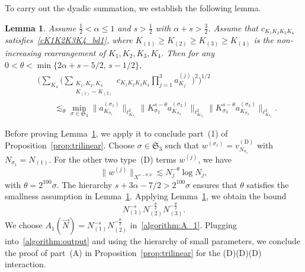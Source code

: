 \documentclass[11pt,reqno,english]{amsart}
\numberwithin{equation}{section}
\theoremstyle{plain}
\newtheorem{lemma}[theorem]{Lemma}
\theoremstyle{definition}
\theoremstyle{remark}
\begin{document}
To carry out the dyadic summation, we establish the following lemma.

\begin{lemma}\label{lem:dyadicsum1}
	Assume $\frac{1}{2}<\alpha\leq 1$ and $s>\frac{1}{2}$ with $\alpha+s>\frac{3}{2}$. Assume that $c_{K_1 K_2 K_3 K_4}$ satisfies~\eqref{cK1K2K3K4_bd1},
	where $K_{(1)}\geq K_{(2)}\geq K_{(3)}\geq K_{(4)}$ is the non-increasing rearrangement of $K_1,K_2,K_3,K_4$. Then for any $0<\theta<\min\{2\alpha+s-5/2,\, s-1/2\}$,
	\begin{align*}
		&\Big(\sum_{K_4}\Big(\sum_{\substack{K_1,K_2,K_3\\ K_{(1)}\sim K_{(2)}}} c_{K_1 K_2 K_3 K_4}\prod_{j=1}^3 a_{K_j}^{(j)}\Big)^2\Big)^{1/2}\\
		&\qquad\lesssim_{\theta} \min_{\sigma\in \mathfrak{S}_3}\|a_{K_{\sigma_1}}^{(\sigma_1)}\|_{\ell_{K_{\sigma_1}}^2}
		\|K_{\sigma_2}^{s-\theta}a_{K_{\sigma_2}}^{(\sigma_2)}\|_{\ell_{K_{\sigma_2}}^2}
		\|K_{\sigma_3}^{s-\theta}a_{K_{\sigma_3}}^{(\sigma_3)}\|_{\ell_{K_{\sigma_3}}^2}.
	\end{align*}
\end{lemma}

Before proving Lemma~\ref{lem:dyadicsum1}, we apply it to conclude part~(1) of Proposition~\ref{prop:trilinear}. Choose $\sigma\in\mathfrak{S}_3$ such that $w^{(\sigma_1)}=v^{(\mathrm{D})}_{N_{\sigma_1}}$ with $N_{\sigma_1}=N_{(1)}$. For the other two type~(D) terms $w^{(j)}$, we have
\[
\|w^{(j)}\|_{X^{s-\theta,b}}\lesssim N_j^{-\theta}\log N_j,
\]
with $\theta=2^{100}\sigma$. The hierarchy $s+3\alpha-7/2>2^{100}\sigma$ ensures that $\theta$ satisfies the smallness assumption in Lemma~\ref{lem:dyadicsum1}.
Applying Lemma~\ref{lem:dyadicsum1}, we obtain the bound
\[
N_{(1)}^{-s}N_{(2)}^{-\frac{\theta}{2}}N_{(3)}^{-\frac{\theta}{2}}.
\]
We choose $A_1(\vec{N})=N_{(1)}^{-s}N_{(2)}^{-\frac{\theta}{2}}$ in~\eqref{algorithm:A_1}. Plugging into~\eqref{algorithm:output} and using the hierarchy of small parameters, we conclude the proof of part~(A) in Proposition~\ref{prop:trilinear} for the (D)(D)(D) interaction.
\end{document}
